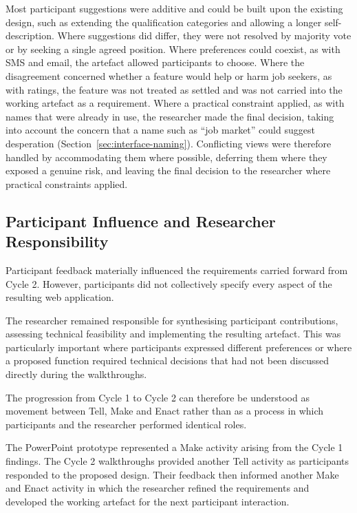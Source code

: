 Most participant suggestions were additive and could be built upon the existing design, such as extending the qualification categories and allowing a longer self-description. Where suggestions did differ, they were not resolved by majority vote or by seeking a single agreed position. Where preferences could coexist, as with SMS and email, the artefact allowed participants to choose. Where the disagreement concerned whether a feature would help or harm job seekers, as with ratings, the feature was not treated as settled and was not carried into the working artefact as a requirement. Where a practical constraint applied, as with names that were already in use, the researcher made the final decision, taking into account the concern that a name such as ``job market'' could suggest desperation (Section~\ref{sec:interface-naming}). Conflicting views were therefore handled by accommodating them where possible, deferring them where they exposed a genuine risk, and leaving the final decision to the researcher where practical constraints applied.
\subsection{Participant Influence and Researcher Responsibility}

Participant feedback materially influenced the requirements carried forward from Cycle 2. However, participants did not collectively specify every aspect of the resulting web application.

The researcher remained responsible for synthesising participant contributions, assessing technical feasibility and implementing the resulting artefact. This was particularly important where participants expressed different preferences or where a proposed function required technical decisions that had not been discussed directly during the walkthroughs.

The progression from Cycle 1 to Cycle 2 can therefore be understood as movement between Tell, Make and Enact rather than as a process in which participants and the researcher performed identical roles.

The PowerPoint prototype represented a Make activity arising from the Cycle 1 findings. The Cycle 2 walkthroughs provided another Tell activity as participants responded to the proposed design. Their feedback then informed another Make and Enact activity in which the researcher refined the requirements and developed the working artefact for the next participant interaction.



